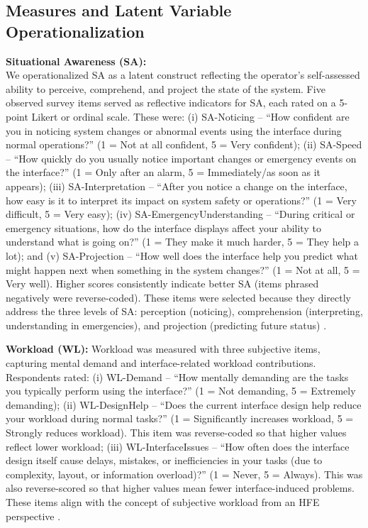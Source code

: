 \documentclass[conference]{IEEEtran}
\begin{document}
\subsection{Measures and Latent Variable Operationalization}
\textbf{Situational Awareness (SA):} \\
We operationalized SA as a latent construct reflecting the operator’s self-assessed ability to perceive, comprehend, and project the state of the system. Five observed survey items served as reflective indicators for SA, each rated on a 5-point Likert or ordinal scale. These were: (i) SA-Noticing – “How confident are you in noticing system changes or abnormal events using the interface during normal operations?” (1 = Not at all confident, 5 = Very confident); (ii) SA-Speed – “How quickly do you usually notice important changes or emergency events on the interface?” (1 = Only after an alarm, 5 = Immediately/as soon as it appears); (iii) SA-Interpretation – “After you notice a change on the interface, how easy is it to interpret its impact on system safety or operations?” (1 = Very difficult, 5 = Very easy); (iv) SA-EmergencyUnderstanding – “During critical or emergency situations, how do the interface displays affect your ability to understand what is going on?” (1 = They make it much harder, 5 = They help a lot); and (v) SA-Projection – “How well does the interface help you predict what might happen next when something in the system changes?” (1 = Not at all, 5 = Very well). Higher scores consistently indicate better SA (items phrased negatively were reverse-coded). These items were selected because they directly address the three levels of SA: perception (noticing), comprehension (interpreting, understanding in emergencies), and projection (predicting future status) \cite{sage1995toward}.

\textbf{Workload (WL):} Workload was measured with three subjective items, capturing mental demand and interface-related workload contributions. Respondents rated: (i) WL-Demand – “How mentally demanding are the tasks you typically perform using the interface?” (1 = Not demanding, 5 = Extremely demanding); (ii) WL-DesignHelp – “Does the current interface design help reduce your workload during normal tasks?” (1 = Significantly increases workload, 5 = Strongly reduces workload). This item was reverse-coded so that higher values reflect lower workload; (iii) WL-InterfaceIssues – “How often does the interface design itself cause delays, mistakes, or inefficiencies in your tasks (due to complexity, layout, or information overload)?” (1 = Never, 5 = Always). This was also reverse-scored so that higher values mean fewer interface-induced problems. These items align with the concept of subjective workload from an HFE perspective \cite{taylor1995situation}.
\end{document}
